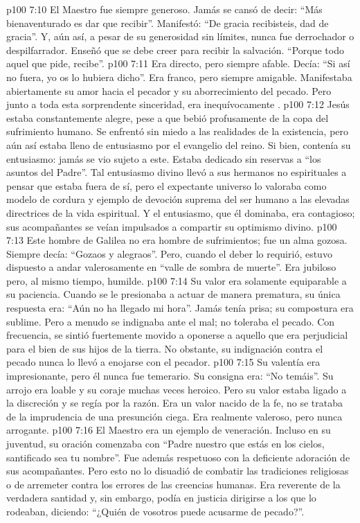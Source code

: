\vs p100 7:10 El Maestro fue siempre generoso. Jamás se cansó de decir: “Más bienaventurado es dar que recibir”. Manifestó: “De gracia recibisteis, dad de gracia”. Y, aún así, a pesar de su generosidad sin límites, nunca fue derrochador o despilfarrador. Enseñó que se debe creer para recibir la salvación. “Porque todo aquel que pide, recibe”.
\vs p100 7:11 Era directo, pero siempre afable. Decía: “Si así no fuera, yo os lo hubiera dicho”. Era franco, pero siempre amigable. Manifestaba abiertamente su amor hacia el pecador y su aborrecimiento del pecado. Pero junto a toda esta sorprendente sinceridad, era inequívocamente .
\vs p100 7:12 Jesús estaba constantemente alegre, pese a que bebió profusamente de la copa del sufrimiento humano. Se enfrentó sin miedo a las realidades de la existencia, pero aún así estaba lleno de entusiasmo por el evangelio del reino. Si bien, contenía su entusiasmo: jamás se vio sujeto a este. Estaba dedicado sin reservas a “los asuntos del Padre”. Tal entusiasmo divino llevó a sus hermanos no espirituales a pensar que estaba fuera de sí, pero el expectante universo lo valoraba como modelo de cordura y ejemplo de devoción suprema del ser humano a las elevadas directrices de la vida espiritual. Y el entusiasmo, que él dominaba, era contagioso; sus acompañantes se veían impulsados a compartir su optimismo divino.
\vs p100 7:13 Este hombre de Galilea no era hombre de sufrimientos; fue un alma gozosa. Siempre decía: “Gozaos y alegraos”. Pero, cuando el deber lo requirió, estuvo dispuesto a andar valerosamente en “valle de sombra de muerte”. Era jubiloso pero, al mismo tiempo, humilde.
\vs p100 7:14 Su valor era solamente equiparable a su paciencia. Cuando se le presionaba a actuar de manera prematura, su única respuesta era: “Aún no ha llegado mi hora”. Jamás tenía prisa; su compostura era sublime. Pero a menudo se indignaba ante el mal; no toleraba el pecado. Con frecuencia, se sintió fuertemente movido a oponerse a aquello que era perjudicial para el bien de sus hijos de la tierra. No obstante, su indignación contra el pecado nunca lo llevó a enojarse con el pecador.
\vs p100 7:15 Su valentía era impresionante, pero él nunca fue temerario. Su consigna era: “No temáis”. Su arrojo era loable y su coraje muchas veces heroico. Pero su valor estaba ligado a la discreción y se regía por la razón. Era un valor nacido de la fe, no se trataba de la imprudencia de una presunción ciega. Era realmente valeroso, pero nunca arrogante.
\vs p100 7:16 El Maestro era un ejemplo de veneración. Incluso en su juventud, su oración comenzaba con “Padre nuestro que estás en los cielos, santificado sea tu nombre”. Fue además respetuoso con la deficiente adoración de sus acompañantes. Pero esto no lo disuadió de combatir las tradiciones religiosas o de arremeter contra los errores de las creencias humanas. Era reverente de la verdadera santidad y, sin embargo, podía en justicia dirigirse a los que lo rodeaban, diciendo: “¿Quién de vosotros puede acusarme de pecado?”.
